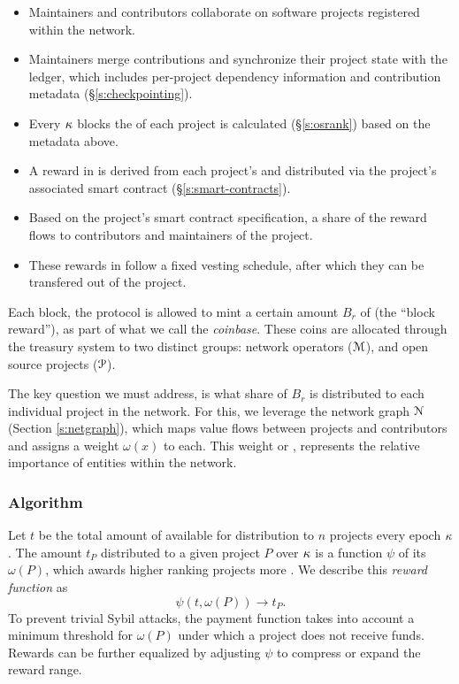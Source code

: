 \begin{itemize}
    \item Maintainers and contributors collaborate on software projects
        registered within the network.
    \item Maintainers merge contributions and synchronize their project state
        with the ledger, which includes per-project dependency information and
        contribution metadata (\S\ref{s:checkpointing}).
    \item Every $\kappa$ blocks the \osrank{} of each project is calculated
        (\S\ref{s:osrank}) based on the metadata above.
    \item A reward in \oscoin{} is derived from each project's \osrank{}
        and distributed via the project's associated smart contract (\S\ref{s:smart-contracts}).
    \item Based on the project's smart contract specification, a share of the reward flows
        to contributors and maintainers of the project.
    \item These rewards in \oscoin{} follow a fixed vesting schedule, after which
        they can be transfered out of the project.
\end{itemize}

\medskip

\noindent Each block, the protocol is allowed to mint a certain amount $B_r$ of \oscoin{}
(the ``block reward''), as part of what we call the \emph{coinbase}.
These coins are allocated through the treasury system to two distinct groups: network
operators ($\mathcal{M}$), and open source projects ($\mathcal{P}$).

The key question we must address, is what share of $B_r$ is distributed to
each individual project in the network.
For this, we leverage the \oscoin{} network graph $\mathcal{N}$ (Section
\ref{s:netgraph}), which maps value flows between projects and contributors
and assigns a weight $\omega(x)$ to each. This weight or \osrank{}, represents
the relative importance of entities within the network.

\subsubsection{Algorithm} Let $t$ be the total amount of \oscoin{} available for
distribution to $n$ projects every epoch $\kappa$. The amount $t_P$ distributed to a given
project $P$ over $\kappa$ is a function $\psi$ of its \osrank{} $\omega(P)$,
which awards higher ranking projects more \oscoin{}. We describe this
\emph{reward function} as
\[
    \psi(t, \omega(P)) \to t_P.
\]
To prevent trivial Sybil attacks, the payment function takes
into account a minimum threshold for $\omega(P)$ under which a project does not
receive funds. Rewards can be further equalized by adjusting $\psi$ to
compress or expand the reward range.

